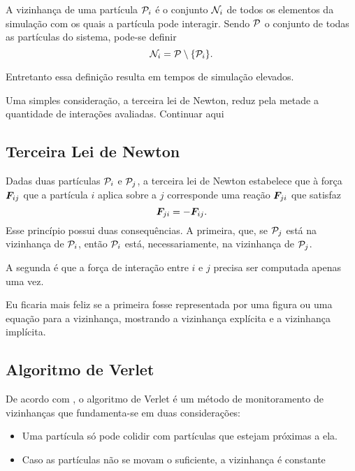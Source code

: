 A vizinhança de uma partícula \(\particlei\) é o conjunto \({\mathcal{N}}_{i}\) de todos os elementos da simulação com os quais a partícula pode interagir. Sendo \(\mathcal{P}\) o conjunto de todas as partículas do sistema, pode-se definir
\begin{equation*}
	\neighborhoodi = \particleSet \setminus \Bqty{\particlei}.
\end{equation*}

Entretanto essa definição resulta em tempos de simulação elevados.

Uma simples consideração, a terceira lei de Newton, reduz pela metade a quantidade de interações avaliadas. \alert{Continuar aqui}

\subsection{Terceira Lei de Newton}

Dadas duas partículas \(\particlei\) e \(\particlej\), a terceira lei de Newton estabelece que à força \({\bm{F}}_{i j}\) que a partícula \(i\) aplica sobre a \(j\) corresponde uma reação \({\bm{F}}_{j i}\) que satisfaz
\begin{equation*}
	{\bm{F}}_{j i} = -{\bm{F}}_{i j}.
\end{equation*}
Esse princípio possui duas consequências. A primeira, que, se \(\particlej\) está na vizinhança de \(\particlei\), então \(\particlei\) está, necessariamente, na vizinhança de \(\particlej\).

A segunda é que a força de interação entre \(i\) e \(j\) precisa ser computada apenas uma vez.

\alert{Eu ficaria mais feliz se a primeira fosse representada por uma figura ou uma equação para a vizinhança, mostrando a vizinhança explícita e a vizinhança implícita.}

\subsection{Algoritmo de Verlet}

De acordo com , o algoritmo de Verlet é um método de monitoramento de vizinhanças que fundamenta-se em duas considerações:
\begin{itemize}
	\item Uma partícula só pode colidir com partículas que estejam próximas a ela.
	\item \alert{Caso as partículas não se movam o suficiente, a vizinhança é constante}
\end{itemize}

